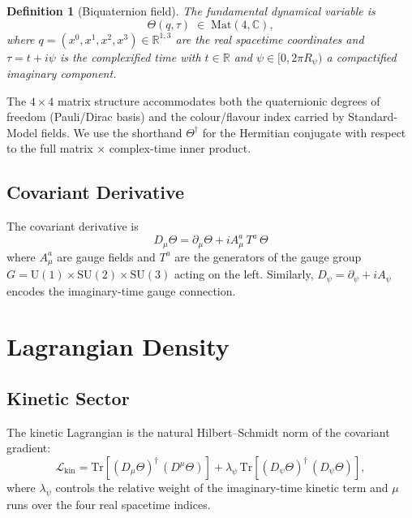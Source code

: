 \documentclass[12pt]{article}
\newtheorem{definition}{Definition}[section]
\newcommand{\C}{\mathbb{C}}
\newcommand{\R}{\mathbb{R}}
\newcommand{\Tr}{\mathrm{Tr}}
\newcommand{\Lag}{\mathcal{L}}
\begin{document}
\begin{definition}[Biquaternion field]
\label{def:theta_field}
The fundamental dynamical variable is
\[
  \Theta(q,\tau)\;\in\;\mathrm{Mat}(4,\C),
\]
where $q=(x^0,x^1,x^2,x^3)\in\R^{1,3}$ are the real spacetime coordinates and
$\tau = t + i\psi$ is the complexified time with $t\in\R$ and $\psi\in[0,2\pi R_\psi)$
a compactified imaginary component.
\end{definition}

The $4\times 4$ matrix structure accommodates both the quaternionic degrees of freedom
(Pauli/Dirac basis) and the colour/flavour index carried by Standard-Model fields.
We use the shorthand $\Theta^\dagger$ for the Hermitian conjugate with respect to the
full matrix $\times$ complex-time inner product.

\subsection{Covariant Derivative}

The covariant derivative is
\begin{equation}
  D_\mu\Theta = \partial_\mu\Theta + i A_\mu^a\,T^a\,\Theta
  \label{eq:cov_deriv}
\end{equation}
where $A_\mu^a$ are gauge fields and $T^a$ are the generators of the gauge group
$G=\mathrm{U}(1)\times\mathrm{SU}(2)\times\mathrm{SU}(3)$ acting on the left.
Similarly, $D_\psi = \partial_\psi + i A_\psi$ encodes the imaginary-time gauge
connection.

\section{Lagrangian Density}

\subsection{Kinetic Sector}

The kinetic Lagrangian is the natural Hilbert--Schmidt norm of the covariant
gradient:
\begin{equation}
  \Lag_{\mathrm{kin}} = \Tr\!\left[(D_\mu\Theta)^\dagger\,(D^\mu\Theta)\right]
  + \lambda_\psi\,\Tr\!\left[(D_\psi\Theta)^\dagger\,(D_\psi\Theta)\right],
  \label{eq:L_kin}
\end{equation}
where $\lambda_\psi$ controls the relative weight of the imaginary-time kinetic
term and $\mu$ runs over the four real spacetime indices.
\end{document}
